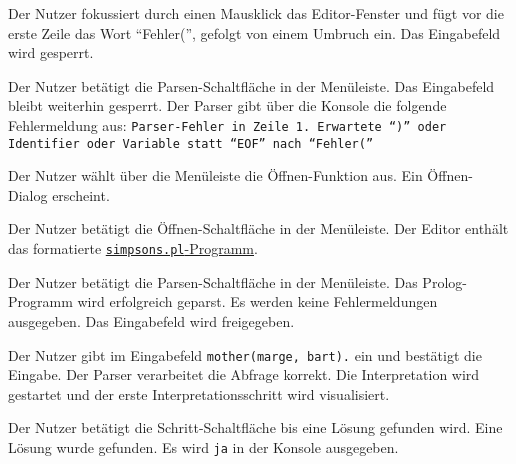 \documentclass[parskip=full,11pt,twoside]{scrartcl}
\begin{document}
{Der Nutzer fokussiert durch einen Mausklick das Editor-Fenster und fügt vor die erste Zeile das Wort \enquote{Fehler(}, gefolgt von einem Umbruch ein.}
{Das Eingabefeld wird gesperrt.}

{Der Nutzer betätigt die Parsen-Schaltfläche in der Menüleiste.}
{Das Eingabefeld bleibt weiterhin gesperrt. Der Parser gibt über die Konsole die folgende Fehlermeldung aus: \texttt{Parser-Fehler in Zeile 1. Erwartete \enquote{)} oder Identifier oder Variable statt \enquote{EOF} nach \enquote{Fehler(}}}


{Der Nutzer wählt über die Menüleiste die Öffnen-Funktion aus.}
{Ein Öffnen-Dialog erscheint.}

{Der Nutzer betätigt die Öffnen-Schaltfläche in der Menüleiste.}
{Der Editor enthält das formatierte \hyperref[appendix:simpsons]{\texttt{simpsons.pl}-Programm}.}

{Der Nutzer betätigt die Parsen-Schaltfläche in der Menüleiste.}
{Das Prolog-Programm wird erfolgreich geparst. Es werden keine Fehlermeldungen ausgegeben. Das Eingabefeld wird freigegeben.}

{Der Nutzer gibt im Eingabefeld \texttt{mother(marge, bart).} ein und bestätigt die Eingabe.}
{Der Parser verarbeitet die Abfrage korrekt. Die Interpretation wird gestartet und der erste Interpretationsschritt wird visualisiert.}

{Der Nutzer betätigt die Schritt-Schaltfläche bis eine Lösung gefunden wird.}
{Eine Lösung wurde gefunden. Es wird \texttt{ja} in der Konsole ausgegeben.}
\end{document}

